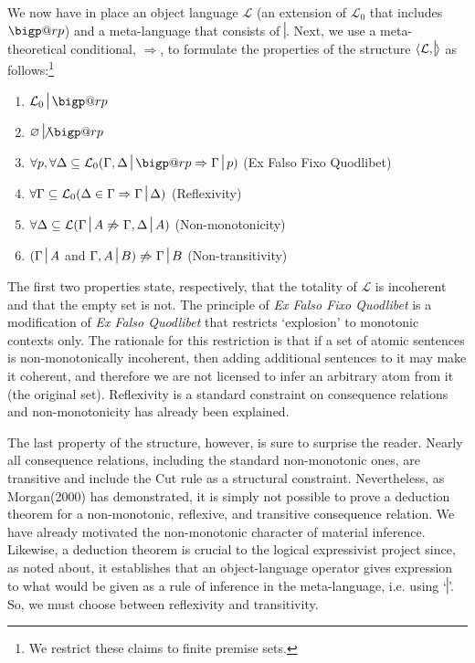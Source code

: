 \documentclass{article}
\makeatletter
\newcommand{\nc}{\turnstile{s}{w}{}{}{n}}
\newcommand{\bigperp}{%
  \mathop{\mathpalette\bigp@rp\relax}%
  \displaylimits
}
\newcommand{\bigp@rp}[2]{%
  \vcenter{
    \m@th\hbox{\scalebox{\ifx#1\displaystyle2.1\else1.5\fi}{$#1\perp$}}
  }%
}
\makeatother
\begin{document}
We now have in place an object language $ \mathcal{L} $ (an extension of  $ \mathcal{L}_0 $ that includes $ \bigperp $) and a meta-language that consists of $ \nc $. Next, we use a meta-theoretical conditional, $ \Rightarrow $, to formulate the properties of the structure $ \langle \mathcal{L}, \nc \rangle  $ as follows:\footnote{We restrict these claims to finite premise sets.}

\begin{enumerate}
	\item $  \mathcal{L}_0\nc\bigperp$
	\item $ \varnothing\not\nc\bigperp $
	\item  $ \forall p, \forall\Delta\subseteq\mathcal{L}_0(\Gamma, \Delta \nc\bigperp \Rightarrow \Gamma\nc p) $ (Ex Falso Fixo Quodlibet)
	\item $\forall \Gamma\subseteq\mathcal{L}_0 (\Delta \in \Gamma \Rightarrow \Gamma\nc \Delta)$ (Reflexivity)
	\item $\forall\Delta\subseteq\mathcal{L}(\Gamma\nc A \not\Rightarrow \Gamma, \Delta \nc A)$ (Non-monotonicity)
	\item $(\Gamma\nc A $ and $ \Gamma, A \nc B ) \not\Rightarrow \Gamma \nc B$ (Non-transitivity)
\end{enumerate}

The first two properties state, respectively, that the totality of $ \mathcal{L} $ is incoherent and that the empty set is not. The principle of \textit{Ex Falso Fixo Quodlibet} is a modification of \textit{Ex Falso Quodlibet} that restricts `explosion' to monotonic contexts only. The rationale for this restriction is that if a set of atomic sentences is non-monotonically incoherent, then adding additional sentences to it may make it coherent, and therefore we are not licensed to infer an arbitrary atom from it (the original set). Reflexivity is a standard constraint on consequence relations and non-monotonicity has already been explained. 

The last property of the structure, however, is sure to surprise the reader. Nearly all consequence relations, including the standard non-monotonic ones, are transitive and include the Cut rule as a structural constraint. Nevertheless, as Morgan(2000) has demonstrated, it is simply not possible to prove a deduction theorem for a non-monotonic, reflexive, and transitive consequence relation. We have already motivated the non-monotonic character of material inference. Likewise, a deduction theorem is crucial to the logical expressivist project since, as noted about, it establishes that an object-language operator gives expression to what would be given as a rule of inference in the meta-language, i.e. using `$ \nc $'. So, we must choose between  reflexivity and transitivity. 
\end{document}
